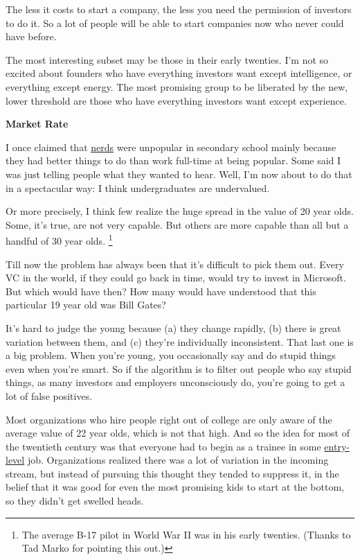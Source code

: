\documentclass[12pt]{book}
\begin{document}
The less it costs to start a company, the less you need the permission
of investors to do it. So a lot of people will be able to start
companies now who never could have before.

The most interesting subset may be those in their early twenties. I'm
not so excited about founders who have everything investors want except
intelligence, or everything except energy. The most promising group to
be liberated by the new, lower threshold are those who have everything
investors want except experience.

\textbf{Market Rate}

I once claimed that \href{nerds.html}{nerds} were unpopular in secondary
school mainly because they had better things to do than work full-time
at being popular. Some said I was just telling people what they wanted
to hear. Well, I'm now about to do that in a spectacular way: I think
undergraduates are undervalued.

Or more precisely, I think few realize the huge spread in the value of
20 year olds. Some, it's true, are not very capable. But others are more
capable than all but a handful of 30 year olds. \footnote{The average B-17 pilot in World War II was in his early
twenties. (Thanks to Tad Marko for pointing this out.)}

Till now the problem has always been that it's difficult to pick them
out. Every VC in the world, if they could go back in time, would try to
invest in Microsoft. But which would have then? How many would have
understood that this particular 19 year old was Bill Gates?

It's hard to judge the young because (a) they change rapidly, (b) there
is great variation between them, and (c) they're individually
inconsistent. That last one is a big problem. When you're young, you
occasionally say and do stupid things even when you're smart. So if the
algorithm is to filter out people who say stupid things, as many
investors and employers unconsciously do, you're going to get a lot of
false positives.

Most organizations who hire people right out of college are only aware
of the average value of 22 year olds, which is not that high. And so the
idea for most of the twentieth century was that everyone had to begin as
a trainee in some
\href{http://slashdot.org/comments.pl?sid=158756&cid=13299057}{entry-level}
job. Organizations realized there was a lot of variation in the incoming
stream, but instead of pursuing this thought they tended to suppress it,
in the belief that it was good for even the most promising kids to start
at the bottom, so they didn't get swelled heads.
\end{document}
